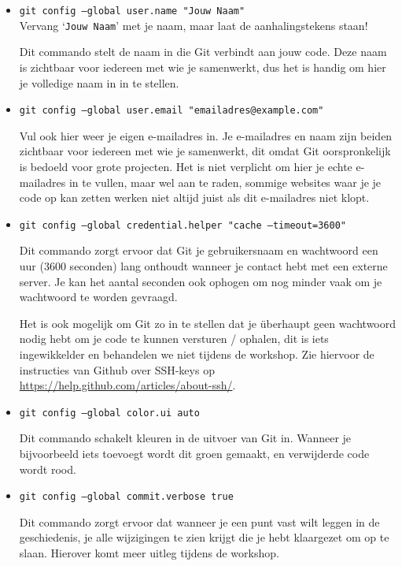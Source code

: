 \documentclass[a4paper]{extarticle}
\newcommand{\shell}[1]{\texttt{#1}}
\begin{document}
\begin{itemize}
	\item \shell{git config --global user.name "Jouw Naam"}\\
		Vervang `\texttt{Jouw Naam}' met je naam, maar laat de aanhalingstekens staan!

		Dit commando stelt de naam in die Git verbindt aan jouw code. Deze naam is zichtbaar voor iedereen met wie je
		samenwerkt, dus het is handig om hier je volledige naam in in te stellen.

	\item \shell{git config --global user.email "emailadres@example.com"}

		Vul ook hier weer je eigen e-mailadres in. Je e-mailadres en naam zijn beiden zichtbaar voor iedereen met wie je
		samenwerkt, dit omdat Git oorspronkelijk is bedoeld voor grote projecten. Het is niet verplicht om hier je echte
		e-mailadres in te vullen, maar wel aan te raden, sommige websites waar je je code op kan zetten werken niet
		altijd juist als dit e-mailadres niet klopt.

	\item \shell{git config --global credential.helper "cache --timeout=3600"}

		Dit commando zorgt ervoor dat Git je gebruikersnaam en wachtwoord een uur (3600 seconden) lang onthoudt wanneer
		je contact hebt met een externe server. Je kan het aantal seconden ook ophogen om nog minder vaak om je
		wachtwoord te worden gevraagd.

		Het is ook mogelijk om Git zo in te stellen dat je überhaupt geen wachtwoord nodig hebt om je code te kunnen
		versturen / ophalen, dit is iets ingewikkelder en behandelen we niet tijdens de workshop. Zie hiervoor de
		instructies van Github over SSH-keys op \url{https://help.github.com/articles/about-ssh/}.

	\item \shell{git config --global color.ui auto}

		Dit commando schakelt kleuren in de uitvoer van Git in. Wanneer je bijvoorbeeld iets toevoegt wordt dit groen
		gemaakt, en verwijderde code wordt rood.

	\item \shell{git config --global commit.verbose true}

		Dit commando zorgt ervoor dat wanneer je een punt vast wilt leggen in de geschiedenis, je alle wijzigingen te
		zien krijgt die je hebt klaargezet om op te slaan. Hierover komt meer uitleg tijdens de workshop.
\end{itemize}
\end{document}
